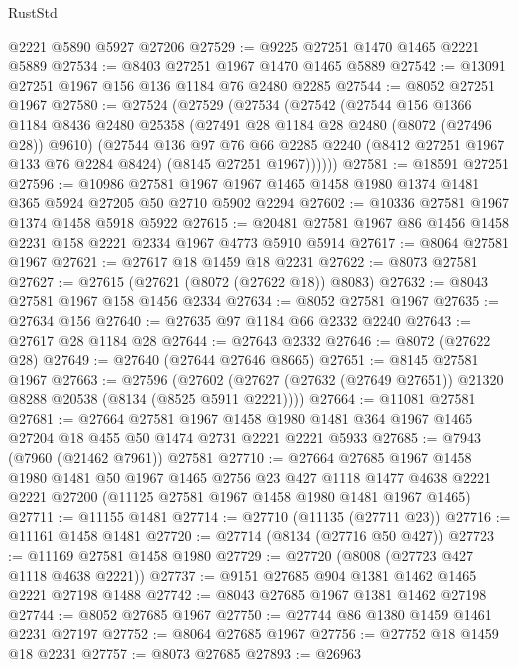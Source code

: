 \begin{lexlean}{RustStd}
\begin{coremodule}
    @2221
    @5890
    @5927
    @27206
@27529 := @9225 @27251 @1470 @1465 @2221 @5889
@27534 := @8403 @27251 @1967 @1470 @1465 @5889
@27542 := @13091 @27251 @1967 @156 @136 @1184 @76 @2480 @2285
@27544 := @8052 @27251 @1967
@27580 := @27524
    (@27529
      (@27534
        (@27542
          (@27544
            @156
            @1366
            @1184
            @8436
            @2480
            @25358
            (@27491 @28 @1184 @28 @2480 (@8072 (@27496 @28)) @9610)
            (@27544
              @136
              @97
              @76
              @66
              @2285
              @2240
              (@8412 @27251 @1967 @133 @76 @2284 @8424)
              (@8145 @27251 @1967))))))
@27581 := @18591 @27251
@27596 := @10986
    @27581
    @1967
    @1967
    @1465
    @1458
    @1980
    @1374
    @1481
    @365
    @5924
    @27205
    @50
    @2710
    @5902
    @2294
@27602 := @10336 @27581 @1967 @1374 @1458 @5918 @5922
@27615 := @20481 @27581 @1967 @86 @1456 @1458 @2231 @158 @2221 @2334 @1967 @4773 @5910 @5914
@27617 := @8064 @27581 @1967
@27621 := @27617 @18 @1459 @18 @2231
@27622 := @8073 @27581
@27627 := @27615 (@27621 (@8072 (@27622 @18)) @8083)
@27632 := @8043 @27581 @1967 @158 @1456 @2334
@27634 := @8052 @27581 @1967
@27635 := @27634 @156
@27640 := @27635 @97 @1184 @66 @2332 @2240
@27643 := @27617 @28 @1184 @28
@27644 := @27643 @2332
@27646 := @8072 (@27622 @28)
@27649 := @27640 (@27644 @27646 @8665)
@27651 := @8145 @27581 @1967
@27663 := @27596
    (@27602 (@27627 (@27632 (@27649 @27651)) @21320 @8288 @20538 (@8134 (@8525 @5911 @2221))))
@27664 := @11081 @27581
@27681 := @27664
    @27581
    @1967
    @1458
    @1980
    @1481
    @364
    @1967
    @1465
    @27204
    @18
    @455
    @50
    @1474
    @2731
    @2221
    @2221
    @5933
@27685 := @7943 (@7960 (@21462 @7961)) @27581
@27710 := @27664
    @27685
    @1967
    @1458
    @1980
    @1481
    @50
    @1967
    @1465
    @2756
    @23
    @427
    @1118
    @1477
    @4638
    @2221
    @2221
    @27200
    (@11125 @27581 @1967 @1458 @1980 @1481 @1967 @1465)
@27711 := @11155 @1481
@27714 := @27710 (@11135 (@27711 @23))
@27716 := @11161 @1458 @1481
@27720 := @27714 (@8134 (@27716 @50 @427))
@27723 := @11169 @27581 @1458 @1980
@27729 := @27720 (@8008 (@27723 @427 @1118 @4638 @2221))
@27737 := @9151 @27685 @904 @1381 @1462 @1465 @2221 @27198 @1488
@27742 := @8043 @27685 @1967 @1381 @1462 @27198
@27744 := @8052 @27685 @1967
@27750 := @27744 @86 @1380 @1459 @1461 @2231 @27197
@27752 := @8064 @27685 @1967
@27756 := @27752 @18 @1459 @18 @2231
@27757 := @8073 @27685
@27893 := @26963

\end{coremodule}
\end{lexlean}
